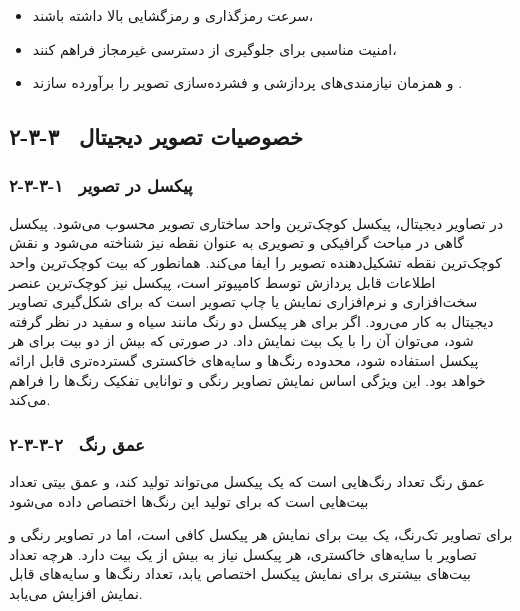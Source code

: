 \begin{itemize}
    \item سرعت رمزگذاری و رمزگشایی بالا داشته باشند،
\end{itemize}

\begin{itemize}
    \item امنیت مناسبی برای جلوگیری از دسترسی غیرمجاز فراهم کنند،
\end{itemize}

\begin{itemize}
    \item و همزمان نیازمندی‌های پردازشی و فشرده‌سازی تصویر را برآورده سازند \cite{ref41}.
\end{itemize}

\subsection{۲-۳-۳  خصوصیات تصویر دیجیتال}

\subsubsection{۲-۳-۳-۱  پیکسل در تصویر}

در تصاویر دیجیتال، پیکسل کوچک‌ترین واحد ساختاری تصویر محسوب می‌شود. پیکسل گاهی در مباحث گرافیکی و تصویری به عنوان نقطه نیز شناخته می‌شود و نقش کوچک‌ترین نقطه تشکیل‌دهنده تصویر را ایفا می‌کند. همانطور که بیت کوچک‌ترین واحد اطلاعات قابل پردازش توسط کامپیوتر است، پیکسل نیز کوچک‌ترین عنصر سخت‌افزاری و نرم‌افزاری نمایش یا چاپ تصویر است که برای شکل‌گیری تصاویر دیجیتال به کار می‌رود. اگر برای هر پیکسل دو رنگ مانند سیاه و سفید در نظر گرفته شود، می‌توان آن را با یک بیت نمایش داد. در صورتی که بیش از دو بیت برای هر پیکسل استفاده شود، محدوده رنگ‌ها و سایه‌های خاکستری گسترده‌تری قابل ارائه خواهد بود. این ویژگی اساس نمایش تصاویر رنگی و توانایی تفکیک رنگ‌ها را فراهم می‌کند\cite{ref42}.

\subsubsection{۲-۳-۳-۲  عمق رنگ}

عمق رنگ تعداد رنگ‌هایی است که یک پیکسل می‌تواند تولید کند، و عمق بیتی تعداد بیت‌هایی است که برای تولید این رنگ‌ها اختصاص داده می‌شود

برای تصاویر تک‌رنگ، یک بیت برای نمایش هر پیکسل کافی است، اما در تصاویر رنگی و تصاویر با سایه‌های خاکستری، هر پیکسل نیاز به بیش از یک بیت دارد. هرچه تعداد بیت‌های بیشتری برای نمایش پیکسل اختصاص یابد، تعداد رنگ‌ها و سایه‌های قابل نمایش افزایش می‌یابد\cite{ref42}.

